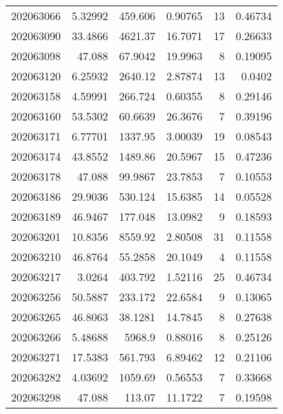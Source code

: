 \begin{tabular}{rrrrrr}
 202063066 &          5.32992 &      459.606  &            0.90765 &          13 & 0.46734 \\
 202063090 &         33.4866  &     4621.37   &           16.7071  &          17 & 0.26633 \\
 202063098 &         47.088   &       67.9042 &           19.9963  &           8 & 0.19095 \\
 202063120 &          6.25932 &     2640.12   &            2.87874 &          13 & 0.0402  \\
 202063158 &          4.59991 &      266.724  &            0.60355 &           8 & 0.29146 \\
 202063160 &         53.5302  &       60.6639 &           26.3676  &           7 & 0.39196 \\
 202063171 &          6.77701 &     1337.95   &            3.00039 &          19 & 0.08543 \\
 202063174 &         43.8552  &     1489.86   &           20.5967  &          15 & 0.47236 \\
 202063178 &         47.088   &       99.9867 &           23.7853  &           7 & 0.10553 \\
 202063186 &         29.9036  &      530.124  &           15.6385  &          14 & 0.05528 \\
 202063189 &         46.9467  &      177.048  &           13.0982  &           9 & 0.18593 \\
 202063201 &         10.8356  &     8559.92   &            2.80508 &          31 & 0.11558 \\
 202063210 &         46.8764  &       55.2858 &           20.1049  &           4 & 0.11558 \\
 202063217 &          3.0264  &      403.792  &            1.52116 &          25 & 0.46734 \\
 202063256 &         50.5887  &      233.172  &           22.6584  &           9 & 0.13065 \\
 202063265 &         46.8063  &       38.1281 &           14.7845  &           8 & 0.27638 \\
 202063266 &          5.48688 &     5968.9    &            0.88016 &           8 & 0.25126 \\
 202063271 &         17.5383  &      561.793  &            6.89462 &          12 & 0.21106 \\
 202063282 &          4.03692 &     1059.69   &            0.56553 &           7 & 0.33668 \\
 202063298 &         47.088   &      113.07   &           11.1722  &           7 & 0.19598 \\

\end{tabular}
